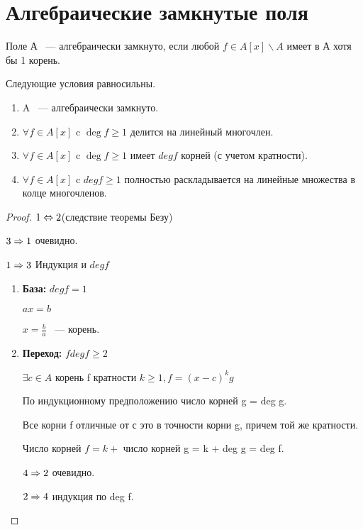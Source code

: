 ﻿\section{Алгебраические замкнутые поля}
\begin{Def}
Поле А ~--- алгебраически замкнуто, если любой $f \in A[x] \backslash A$ имеет в А хотя бы 1 корень.
\end{Def}

\begin{theorem}{}
Следующие условия равносильны. 
\begin{enumerate}
\item A ~--- алгебраически замкнуто. 
\item $\forall f \in A[x]$ c $\deg f \ge 1$ делится на линейный многочлен. 
\item $\forall f \in A[x]$ c $\deg f \ge 1$ имеет $deg f$ корней (с учетом кратности).
\item $\forall f \in A[x]$ c $deg f \ge 1$ полностью раскладывается на линейные множества в колце многочленов.
\end{enumerate}
\end{theorem}

\begin{proof}
$1 \Leftrightarrow 2$(следствие теоремы Безу)

$3 \Rightarrow 1$ очевидно.

$1 \Rightarrow 3$ Индукция и $deg f$

\begin{enumerate}
\item {\bf База:} $deg f = 1$ 

$ax = b$

$x = \frac{b}{a}$ ~--- корень.
\item {\bf Переход:} $f deg f \ge 2$

$\exists c \in A$ корень f кратности $k \ge 1, f = (x - c)^{k}g$

По индукционному предположению число корней g = deg g.

Все корни f отличные от с это в точности корни g, причем той же кратности. 

Число корней $f = k + $ число корней g = k + deg g = deg f.

$4 \Rightarrow 2$ очевидно.

$2 \Rightarrow 4$ индукция по deg f.


\end{enumerate}

\end{proof}